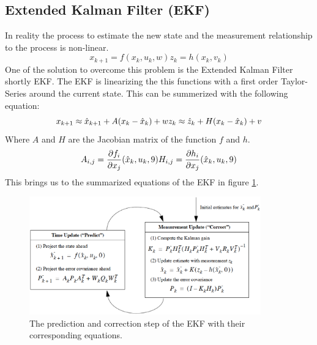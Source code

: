 \subsection*{Extended Kalman Filter (EKF)}\label{ekf}
In reality the process to estimate the new state and the measurement relationship to the process is non-linear.
\begin{equation}
x_{k+1}=f(x_k,u_k,w)
z_k=h(x_k,v_k)
\end{equation}
One of the solution to overcome this problem is the Extended Kalman Filter shortly EKF. The EKF is linearizing the this functions with a first order Taylor-Series around the current state. This can be summerized with the following equation:
\begin{equation}
x_{k+1}\approx \hat{x}_{k+1}+A(x_k-\hat{x}_k)+w\\
z_k\approx \hat{z}_k+H(x_k-\hat{x}_k) +v 
\end{equation}
Where $A$ and $H$ are the Jacobian matrix of the function $f$ and $h$.
\begin{equation}
A_{i,j}=\frac{\partial f_{i}}{\partial x_j}(\hat{x}_k,u_k,9)\\
H_{i,j}=\frac{\partial h_{i}}{\partial x_j}(\hat{x}_k,u_k,9)
\end{equation}
This brings us to the summarized equations of the EKF in figure \ref{equation_ekf}.
\begin{figure}[h]
\begin{center}
\includegraphics[width=10cm]{pictures/equation_ekf.eps}
\caption{The prediction and correction step of the EKF with their corresponding equations. }
\label{equation_ekf}
\end{center}
\end{figure}



